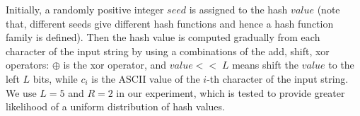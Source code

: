 \documentclass[legalpaper]{article}
\begin{document}
Initially, a randomly positive integer $seed$ is assigned to the hash
$value$ (note that, different seeds give different hash functions and
hence a hash function family is defined). Then the hash value is
computed gradually from each character of the input string by using a
combinations of the \textsf{add, shift, xor} operators: $\oplus$ is
the \textsf{xor} operator, and $value << \;L$ means shift the $value$
to the left $L$ bits, while $c_i$ is the ASCII value of the $i$-th
character of the input string. We use $L=5$ and $R=2$ in our
experiment, which is tested to provide greater likelihood of a uniform
distribution of hash values.

\end{document}
